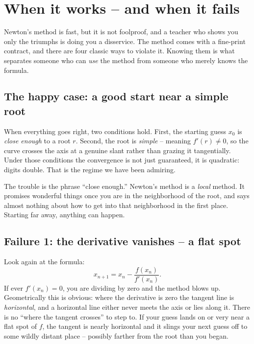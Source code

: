 \section{When it works -- and when it fails}
\label{ch19:failures}

Newton's method is fast, but it is not foolproof, and a teacher who shows you only
the triumphs is doing you a disservice. The method comes with a fine-print
contract, and there are four classic ways to violate it. Knowing them is what
separates someone who can \emph{use} the method from someone who merely knows the
formula.

\subsection{The happy case: a good start near a simple root}

When everything goes right, two conditions hold. First, the starting guess $x_0$ is
\emph{close enough} to a root $r$. Second, the root is \emph{simple} -- meaning
$f'(r) \ne 0$, so the curve crosses the axis at a genuine slant rather than grazing
it tangentially. Under those conditions the convergence is not just guaranteed, it
is quadratic: digits double. That is the regime we have been admiring.

The trouble is the phrase ``close enough.'' Newton's method is a \emph{local}
method. It promises wonderful things once you are in the neighborhood of the root,
and says almost nothing about how to get into that neighborhood in the first place.
Starting far away, anything can happen.

\subsection{Failure 1: the derivative vanishes -- a flat spot}

Look again at the formula:
\[
  x_{n+1} = x_n - \frac{f(x_n)}{f'(x_n)}.
\]
If ever $f'(x_n) = 0$, you are dividing by zero and the method blows up. Geometrically
this is obvious: where the derivative is zero the tangent line is \emph{horizontal},
and a horizontal line either never meets the axis or lies along it. There is no
``where the tangent crosses'' to step to. If your guess lands on or very near a flat
spot of $f$, the tangent is nearly horizontal and it slings your next guess off to
some wildly distant place -- possibly farther from the root than you began.

